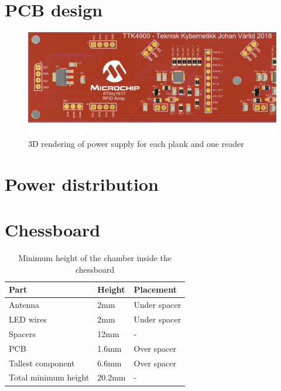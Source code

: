 \newpage
\section{PCB design}

\begin{figure}[H]
    \centering
    \includegraphics[width=\textwidth]{05_My_Implementation/figures/PCB-3D-Render.png}
    \caption{3D rendering of power supply for each plank and one reader}
    \label{fig:3D_PCB_Small}
\end{figure}

\section{Power distribution}
\section{Chessboard}
\cite{roberti_francois}
\begin{table}[H]
\centering
\caption{Minimum height of the chamber inside the chessboard}
\label{my-label}
\begin{tabular}{lll}
\hline
Part                    & Height & Placement    \\
\hline
Antenna                 & 2mm    & Under spacer \\
LED wires               & 2mm    & Under spacer \\
Spacers                 & 12mm   & -            \\
PCB                     & 1.6mm  & Over spacer  \\
Tallest component       & 6.6mm  & Over spacer  \\ 
Total minimum height    & 20.2mm & -            \\ 
\hline
\end{tabular}
\end{table}


